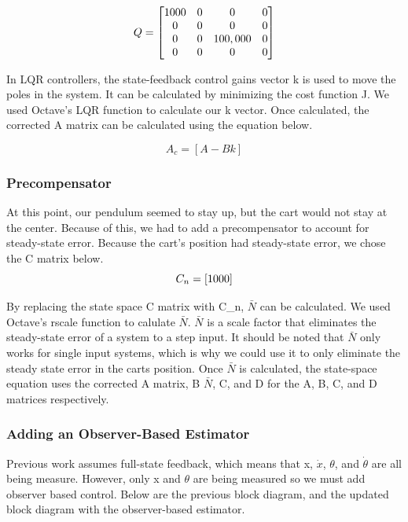 \documentclass{article}
\begin{document}
 \begin{equation} 
\label{q}
\centering
Q = \begin{bmatrix}
	1000&0&0&0\\
	0&0&0&0\\
	0&0&100,000&0\\
	0&0&0&0\\
	\end{bmatrix}
\end{equation}

In LQR controllers, the state-feedback control gains vector k is used to move the poles in the system. It can be calculated by minimizing the cost function J. We used Octave's LQR function to calculate our k vector. Once calculated, the corrected A matrix can be calculated using the equation below.

\begin{equation}
\label{ac}
A_c=[A-Bk]
\end{equation}

\subsubsection{Precompensator}
At this point, our pendulum seemed to stay up, but the cart would not stay at the center. Because of this, we had to add a precompensator to account for steady-state error. Because the cart's position had steady-state error, we chose the C matrix below.
\\

\begin{equation}
\label{pcomp}
\centering
C_n = [1 0 0 0]
\end{equation}
 
 By replacing the state space C matrix with C\_n, $\bar{N}$ can be calculated. We used Octave's rscale function to calulate $\bar{N}$. $\bar{N}$ is a scale factor that eliminates the steady-state error of a system to a step input. It should be noted that $\bar{N}$ only works for single input systems, which is why we could use it to only eliminate the steady state error in the carts position. Once $\bar{N}$ is calculated, the state-space equation uses the corrected A matrix, B $\bar{N}$, C, and D for the A, B, C, and D matrices respectively.
 
 \subsubsection{Adding an Observer-Based Estimator}
 Previous work assumes full-state feedback, which means that x, $\dot{x}$, $\theta$, and $\dot{\theta}$ are all being measure. However, only x and $\theta$ are being measured so we must add observer based control. Below are the previous block diagram, and the updated block diagram with the observer-based estimator.
\end{document}
